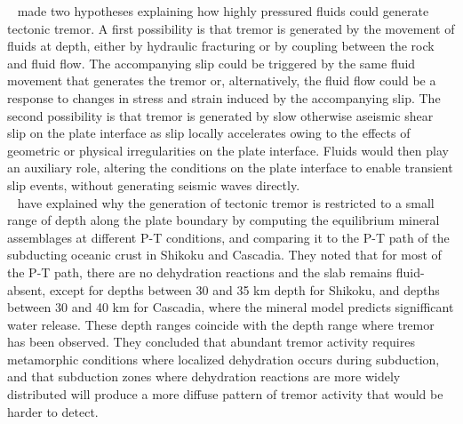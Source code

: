 \documentclass[draft]{agujournal2019}
\begin{document}
~ made two hypotheses explaining how highly pressured fluids could generate tectonic tremor. A first possibility is that tremor is generated by the movement of fluids at depth, either by hydraulic fracturing or by coupling between the rock and fluid flow. The accompanying slip could be triggered by the same fluid movement that generates the tremor or, alternatively, the fluid flow could be a response to changes in stress and strain induced by the accompanying slip. The second possibility is that tremor is generated by slow otherwise aseismic shear slip on the plate interface as slip locally accelerates owing to the effects of geometric or physical irregularities on the plate interface. Fluids would then play an auxiliary role, altering the conditions on the plate interface to enable transient slip events, without generating seismic waves directly. \\

~ have explained why the generation of tectonic tremor is restricted to a small range of depth along the plate boundary by computing the equilibrium mineral assemblages at different P-T conditions, and comparing it to the P-T path of the subducting oceanic crust in Shikoku and Cascadia. They noted that for most of the P-T path, there are no dehydration reactions and the slab remains fluid-absent, except for depths between 30 and 35 km depth for Shikoku, and depths between 30 and 40 km for Cascadia, where the mineral model predicts signifficant water release. These depth ranges coincide with the depth range where tremor has been observed. They concluded that abundant tremor activity requires metamorphic conditions where localized dehydration occurs during subduction, and that subduction zones where dehydration reactions are more widely distributed will produce a more diffuse pattern of tremor activity that would be harder to detect. \\
\end{document}
